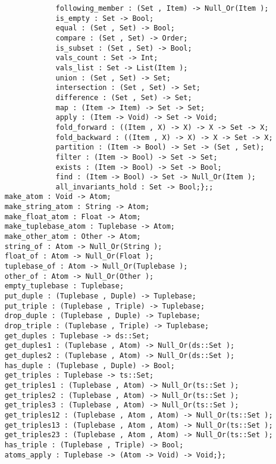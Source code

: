 \begin{verbatim}
                following_member : (Set , Item) -> Null_Or(Item );
                is_empty : Set -> Bool;
                equal : (Set , Set) -> Bool;
                compare : (Set , Set) -> Order;
                is_subset : (Set , Set) -> Bool;
                vals_count : Set -> Int;
                vals_list : Set -> List(Item );
                union : (Set , Set) -> Set;
                intersection : (Set , Set) -> Set;
                difference : (Set , Set) -> Set;
                map : (Item -> Item) -> Set -> Set;
                apply : (Item -> Void) -> Set -> Void;
                fold_forward : ((Item , X) -> X) -> X -> Set -> X;
                fold_backward : ((Item , X) -> X) -> X -> Set -> X;
                partition : (Item -> Bool) -> Set -> (Set , Set);
                filter : (Item -> Bool) -> Set -> Set;
                exists : (Item -> Bool) -> Set -> Bool;
                find : (Item -> Bool) -> Set -> Null_Or(Item );
                all_invariants_hold : Set -> Bool;};;
    make_atom : Void -> Atom;
    make_string_atom : String -> Atom;
    make_float_atom : Float -> Atom;
    make_tuplebase_atom : Tuplebase -> Atom;
    make_other_atom : Other -> Atom;
    string_of : Atom -> Null_Or(String );
    float_of : Atom -> Null_Or(Float );
    tuplebase_of : Atom -> Null_Or(Tuplebase );
    other_of : Atom -> Null_Or(Other );
    empty_tuplebase : Tuplebase;
    put_duple : (Tuplebase , Duple) -> Tuplebase;
    put_triple : (Tuplebase , Triple) -> Tuplebase;
    drop_duple : (Tuplebase , Duple) -> Tuplebase;
    drop_triple : (Tuplebase , Triple) -> Tuplebase;
    get_duples : Tuplebase -> ds::Set;
    get_duples1 : (Tuplebase , Atom) -> Null_Or(ds::Set );
    get_duples2 : (Tuplebase , Atom) -> Null_Or(ds::Set );
    has_duple : (Tuplebase , Duple) -> Bool;
    get_triples : Tuplebase -> ts::Set;
    get_triples1 : (Tuplebase , Atom) -> Null_Or(ts::Set );
    get_triples2 : (Tuplebase , Atom) -> Null_Or(ts::Set );
    get_triples3 : (Tuplebase , Atom) -> Null_Or(ts::Set );
    get_triples12 : (Tuplebase , Atom , Atom) -> Null_Or(ts::Set );
    get_triples13 : (Tuplebase , Atom , Atom) -> Null_Or(ts::Set );
    get_triples23 : (Tuplebase , Atom , Atom) -> Null_Or(ts::Set );
    has_triple : (Tuplebase , Triple) -> Bool;
    atoms_apply : Tuplebase -> (Atom -> Void) -> Void;};
\end{verbatim}
